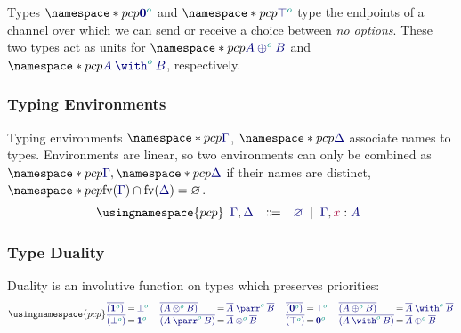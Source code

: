 Types $\pcp{\ty{\tynil[\cs{o}]}}$ and $\pcp{\ty{\tytop[\cs{o}]}}$ type the endpoints of a channel over which we can send or receive a choice between \emph{no options}. These two types act as units for $\pcp{\ty{\typlus[\cs{o}]{A}{B}}}$ and $\pcp{\ty{\tywith[\cs{o}]{A}{B}}}$, respectively.

\subsubsection*{Typing Environments}
\label{sec:pcp-environments}
Typing environments $\pcp{\ty{\Gamma}}$, $\pcp{\ty{\Delta}}$ associate names to types. Environments are linear, so two environments can only be combined as $\pcp{\ty{\Gamma}}, \pcp{\ty{\Delta}}$ if their names are distinct, \ie $\pcp{\fv(\ty{\Gamma})\cap\fv(\ty{\Delta})=\varnothing}$.
\[
  \usingnamespace{pcp}
  \begin{array}{lcl}
    \ty{\Gamma}, \ty{\Delta}
    & \Coloneqq & \ty{\emptyenv}
      \sep        \ty{\Gamma}, \tmty{x}{A}
  \end{array}
\]

\subsubsection*{Type Duality}
\label{sec:pcp-duality}
Duality is an involutive function on types which preserves priorities:
\[
  \usingnamespace{pcp}
  \setlength{\arraycolsep}{1pt}
  \begin{array}{lcl}
    \ty{\co{(\tyone[\cs{o}])}} & = & \ty{\tybot[\cs{o}]} \\
    \ty{\co{(\tybot[\cs{o}])}} & = & \ty{\tyone[\cs{o}]}
  \end{array}
  \quad
  \begin{array}{lcl}
    \ty{\co{(\tytens[\cs{o}]{A}{B})}} & = & \ty{\typarr[\cs{o}]{\co{A}}{\co{B}}} \\
    \ty{\co{(\typarr[\cs{o}]{A}{B})}} & = & \ty{\tytens[\cs{o}]{\co{A}}{\co{B}}}
  \end{array}
  \quad
  \begin{array}{lcl}
    \ty{\co{(\tynil[\cs{o}])}} & = & \ty{\tytop[\cs{o}]} \\
    \ty{\co{(\tytop[\cs{o}])}} & = & \ty{\tynil[\cs{o}]}
  \end{array}
  \quad
  \begin{array}{lcl}
    \ty{\co{(\typlus[\cs{o}]{A}{B})}} & = & \ty{\tywith[\cs{o}]{\co{A}}{\co{B}}} \\
    \ty{\co{(\tywith[\cs{o}]{A}{B})}} & = & \ty{\typlus[\cs{o}]{\co{A}}{\co{B}}}
  \end{array}
\]


